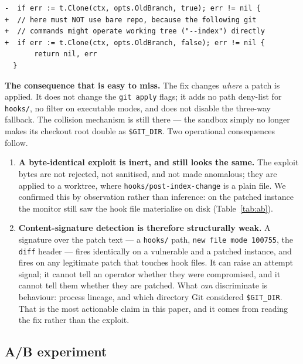 \documentclass[journal]{IEEEtran}
\begin{document}
\begin{lstlisting}[style=diffsrc,
caption={The decisive hunk of the fix (\texttt{services/repository/files/patch.go};
full diff in \texttt{designs/fix-commit-full.diff}). One boolean turns the patch
sandbox from bare to non-bare. The \texttt{git apply} flags of
Listing~\ref{lst:apply} are not touched.},
label={lst:fix}]
-  if err := t.Clone(ctx, opts.OldBranch, true); err != nil {
+  // here must NOT use bare repo, because the following git
+  // commands might operate working tree ("--index") directly
+  if err := t.Clone(ctx, opts.OldBranch, false); err != nil {
       return nil, err
  }
\end{lstlisting}

\textbf{The consequence that is easy to miss.} The fix changes \emph{where} a
patch is applied. It does not change the \texttt{git apply} flags; it adds no
path deny-list for \texttt{hooks/}, no filter on executable modes, and does not
disable the three-way fallback. The collision mechanism is still there --- the
sandbox simply no longer makes its checkout root double as
\texttt{\$GIT\_DIR}. Two operational consequences follow.

\begin{enumerate}
\item \textbf{A byte-identical exploit is inert, and still looks the same.} The
exploit bytes are not rejected, not sanitised, and not made anomalous; they are
applied to a worktree, where \texttt{hooks/post-index-change} is a plain file.
We confirmed this by observation rather than inference: on the patched instance
the monitor still saw the hook file materialise on disk
(Table~\ref{tab:ab}).
\item \textbf{Content-signature detection is therefore structurally weak.} A
signature over the patch text --- a \texttt{hooks/} path, \texttt{new file mode
100755}, the \texttt{diff} header --- fires identically on a vulnerable and a
patched instance, and fires on any legitimate patch that touches hook files. It
can raise an attempt signal; it cannot tell an operator whether they were
compromised, and it cannot tell them whether they are patched. What \emph{can}
discriminate is behaviour: process lineage, and which directory Git considered
\texttt{\$GIT\_DIR}. That is the most actionable claim in this paper, and it
comes from reading the fix rather than the exploit.
\end{enumerate}

\subsection{A/B experiment}
\end{document}
